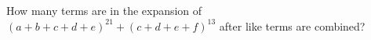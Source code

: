 How many terms are in the expansion of $(a+b+c+d+e)^{21}+(c+d+e+f)^{13}$ after like terms are combined?
